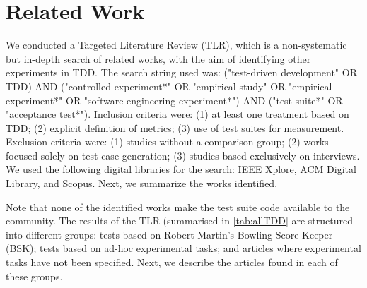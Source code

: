 \section{Related Work}
\label{sec:relatedwork}

We conducted a Targeted Literature Review (TLR), which is a non-systematic but in-depth search of related works, with the aim of identifying other experiments in TDD. The search string used was: ("test-driven development" OR TDD) AND ("controlled experiment*" OR "empirical study" OR "empirical experiment*" OR "software engineering experiment*") AND ("test suite*" OR "acceptance test*"). Inclusion criteria were:
(1) at least one treatment based on TDD;
(2) explicit definition of metrics;
(3) use of test suites for measurement.
Exclusion criteria were:
(1) studies without a comparison group;
(2) works focused solely on test case generation;
(3) studies based exclusively on interviews.
We used the following digital libraries for the search: IEEE Xplore, ACM Digital Library, and Scopus.
Next, we summarize the works identified.



Note that none of the identified works make the test suite code available to the community. The results of the TLR (summarised in \ref{tab:allTDD} are structured into different groups: tests based on Robert Martin's Bowling Score Keeper (BSK); tests based on ad-hoc experimental tasks; and articles where experimental tasks have not been specified.  Next, we describe the articles found in each of these groups.



